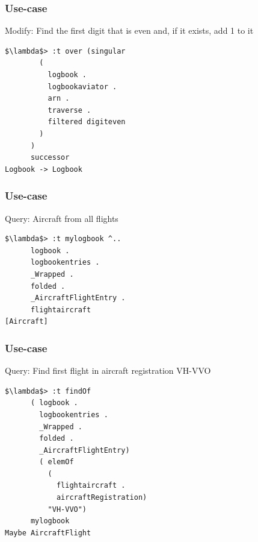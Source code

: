 \begin{frame}[fragile]
\frametitle{Use-case}
\begin{block}{Modify: Find the first digit that is even and, if it exists, add 1 to it}
\begin{lstlisting}[style=haskell,basicstyle=\scriptsize\ttfamily,mathescape]
$\lambda$> :t over (singular
        ( 
          logbook .
          logbookaviator .
          arn .
          traverse .
          filtered digiteven
        )
      )
      successor
Logbook -> Logbook
\end{lstlisting}
\end{block}
\end{frame}

\begin{frame}[fragile]
\frametitle{Use-case}
\begin{block}{Query: Aircraft from all flights}
\begin{lstlisting}[style=haskell,basicstyle=\scriptsize\ttfamily,mathescape]
$\lambda$> :t mylogbook ^..
      logbook .
      logbookentries .
      _Wrapped .
      folded .
      _AircraftFlightEntry .
      flightaircraft
[Aircraft]
\end{lstlisting}
\end{block}
\end{frame}

\begin{frame}[fragile]
\frametitle{Use-case}
\begin{block}{Query: Find first flight in aircraft registration VH-VVO}
\begin{lstlisting}[style=haskell,basicstyle=\scriptsize\ttfamily,mathescape]
$\lambda$> :t findOf
      ( logbook . 
        logbookentries . 
        _Wrapped . 
        folded . 
        _AircraftFlightEntry)
        ( elemOf
          (
            flightaircraft . 
            aircraftRegistration)
          "VH-VVO")
      mylogbook
Maybe AircraftFlight
\end{lstlisting}
\end{block}
\end{frame}

